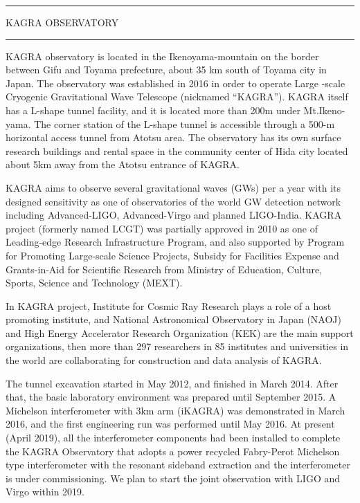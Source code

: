 
\onecolumn %

\begin{center}
\hrule
\vspace{10pt}
{\bigsf KAGRA OBSERVATORY}
\label{kagra}
\vspace{10pt}
\hrule
\end{center}

\begin{multicols}{2}
KAGRA observatory is located in the Ikenoyama-mountain on the border
between Gifu and Toyama prefecture, about 35 km south of Toyama city in
Japan. The observatory was established in 2016 in order to operate Large
-scale Cryogenic Gravitational Wave Telescope (nicknamed “KAGRA”). KAGRA
itself has a L-shape tunnel facility, and it is located more than 200m
under Mt.Ikeno-yama. The corner station of the L-shape tunnel is
accessible through a 500-m horizontal access tunnel from Atotsu area.
The observatory has its own surface research buildings and rental space
in the community center of Hida city located about 5km away from the
Atotsu entrance of KAGRA.

KAGRA aims to observe several gravitational waves (GWs) per a year with
its designed sensitivity as one of observatories of the world GW
detection network including Advanced-LIGO, Advanced-Virgo and planned
LIGO-India. KAGRA project (formerly named LCGT) was partially approved
in 2010 as one of Leading-edge Research Infrastructure Program, and also
supported by Program for Promoting Large-scale Science Projects, Subsidy
for Facilities Expense and Grants-in-Aid for Scientific Research from
Ministry of Education, Culture, Sports, Science and Technology (MEXT).

In KAGRA project, Institute for Cosmic Ray Research plays a role of a
host promoting institute, and National Astronomical Observatory in Japan
(NAOJ) and High Energy Accelerator Research Organization (KEK) are the
main support organizations, then more than 297 researchers in 85
institutes and universities in the world are collaborating for
construction and data analysis of KAGRA.

The tunnel excavation started in May 2012, and finished in March 2014.
After that, the basic laboratory environment was prepared until
September 2015. A Michelson interferometer with 3km arm (iKAGRA) was
demonstrated in March 2016, and the first engineering run was performed
until May 2016.  At present (April 2019), all the interferometer components had been installed to complete 
the KAGRA Observatory that adopts a power recycled Fabry-Perot Michelson type interferometer 
with the resonant sideband extraction and the interferometer is under commissioning.
We plan to start the joint observation with LIGO and Virgo within 2019.

\end{multicols} 


